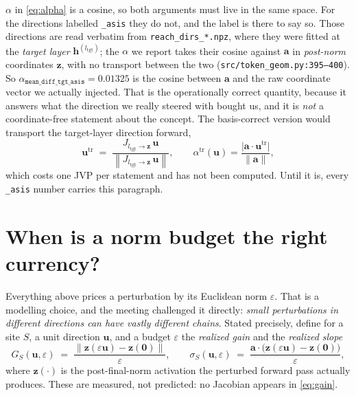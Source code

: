 \documentclass[11pt]{article}
\newcommand{\vh}{\bm{h}}
\newcommand{\vz}{\bm{z}}
\newcommand{\va}{\bm{a}}
\newcommand{\vu}{\bm{u}}
\newcommand{\norm}[1]{\left\lVert #1 \right\rVert}
\begin{document}
$\alpha$ in \eqref{eq:alpha} is a cosine, so both arguments must live in the same
space. For the directions labelled \texttt{\_asis} they do not, and the label is there
to say so. Those directions are read verbatim from
\texttt{reach\_dirs\_*.npz}, where they were fitted at the \emph{target layer}
$\vh^{(l_{\mathrm{tgt}})}$; the $\alpha$ we report takes their cosine against $\va$ in
\emph{post-norm} coordinates $\vz$, with no transport between the two
(\texttt{src/token\_geom.py:395--400}). So
$\alpha_{\texttt{mean\_diff\_tgt\_asis}} = 0.01325$ is the cosine between $\va$ and the
raw coordinate vector we actually injected. That is the operationally correct quantity,
because it answers what the direction we really steered with bought us, and it is
\emph{not} a coordinate-free statement about the concept. The basis-correct version
would transport the target-layer direction forward,
\begin{equation}\label{eq:transport}
  \vu^{\mathrm{tr}} \;=\; \frac{J_{l_{\mathrm{tgt}}\to\vz}\,\vu}
                                {\norm{J_{l_{\mathrm{tgt}}\to\vz}\,\vu}},
  \qquad
  \alpha^{\mathrm{tr}}(\vu) = \frac{\lvert \va\cdot\vu^{\mathrm{tr}}\rvert}{\norm{\va}},
\end{equation}
which costs one JVP per statement and has not been computed. Until it is, every
\texttt{\_asis} number carries this paragraph.

\section{When is a norm budget the right currency?}\label{sec:gain}

Everything above prices a perturbation by its Euclidean norm $\varepsilon$. That is a
modelling choice, and the meeting challenged it directly: \emph{small perturbations in
different directions can have vastly different chains}. Stated precisely, define for a
site $S$, a unit direction $\vu$, and a budget $\varepsilon$ the \emph{realized gain}
and the \emph{realized slope}
\begin{equation}\label{eq:gain}
  G_S(\vu,\varepsilon) \;=\; \frac{\norm{\vz(\varepsilon\vu) - \vz(\bm 0)}}{\varepsilon},
  \qquad
  \sigma_S(\vu,\varepsilon) \;=\; \frac{\va\cdot\bigl(\vz(\varepsilon\vu)-\vz(\bm
  0)\bigr)}{\varepsilon},
\end{equation}
where $\vz(\cdot)$ is the post-final-norm activation the perturbed forward pass
actually produces. These are measured, not predicted: no Jacobian appears in
\eqref{eq:gain}.
\end{document}
